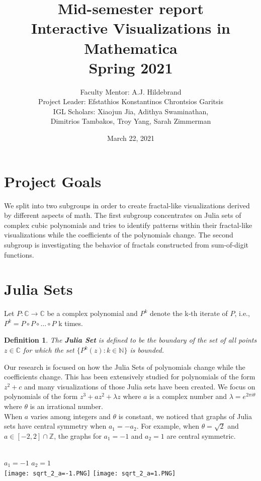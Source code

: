 \documentclass[12pt]{article}
\newtheorem*{defn}{Definition}
\begin{document}
\title{Mid-semester report\\ 
Interactive Visualizations in Mathematica 
\\
Spring 2021}
\author{Faculty Mentor: A.J. Hildebrand \\
    Project Leader: Efstathios Konstantinos Chrontsios Garitsis \\
	IGL Scholars: Xiaojun Jia, Adithya Swaminathan, \\
	Dimitrios Tambakos, Troy Yang, Sarah Zimmerman}
	\date{March 22, 2021}
\maketitle
\section{Project Goals}
We split into two subgroups in order to create fractal-like visualizations derived by different aspects of math. The first subgroup concentrates on  Julia sets of complex cubic \mbox{polynomials} and tries to identify patterns within their fractal-like visualizations while the coefficients of the polynomials change. The second subgroup is investigating the behavior of fractals constructed from sum-of-digit functions.

\section{Julia Sets}
Let $P: \mathbb{C} \rightarrow \mathbb{C}$ be a complex polynomial and ${P^k}$ denote the k-th iterate of ${P}$, i.e., $P^k = P \circ P \circ \dots \circ P$  k times.

\begin{defn}
The \textbf{Julia Set} is defined to be the boundary of the set of all points ${z \in \mathbb{C}}$ for which the set $\{P^{k}(z) : k \in \mathbb{N}\}$ is bounded.
\end{defn}

Our research is focused on how the Julia Sets of polynomials change while the \mbox{coefficients} change. This has been extensively studied for polynomials of the form ${z^2 + c}$ and many \mbox{visualizations} of those Julia sets have been created. We focus on polynomials of the form ${z^3 + az^2 + \lambda z}$ where ${a}$ is a complex number and ${\lambda = e^{2 \pi i \theta}}$ where ${\theta}$ is an irrational number.\\

When $a$ varies among integers and $\theta$ is constant, we noticed that graphs of Julia sets have central symmetry when $a_1=-a_2$. For example, when $\theta = \sqrt{2}$ and $a\in [-2,2] \cap \mathbb{Z}$, the graphs for $a_1 = -1$ and $a_2 = 1$ are central symmetric.
\newpage
\begin{center}
      	~\\$a_1 = -1$ \hspace{2.15in}$a_2 = 1$
        ~\\\texttt{[image: sqrt\_2\_a=-1.PNG]}
        \hspace{0.6in}
        \texttt{[image: sqrt\_2\_a=1.PNG]}
\end{center}
\end{document}

